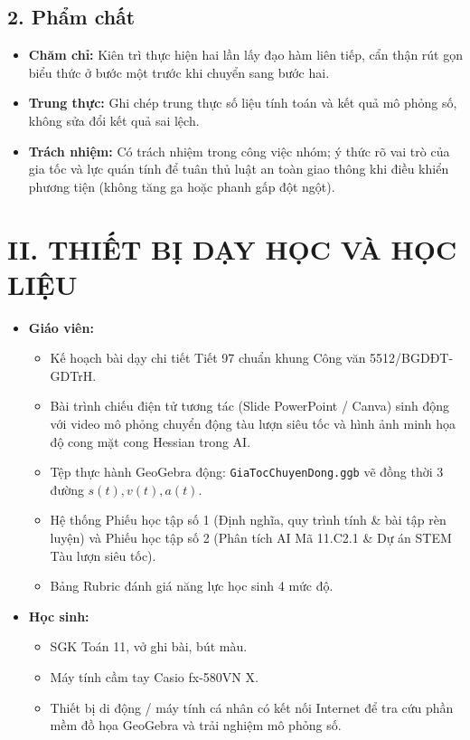 \documentclass[12pt, a4paper]{article}
\begin{document}
\subsection*{2. Phẩm chất}

\begin{itemize}[leftmargin=1.2cm]
    \item \textbf{Chăm chỉ:} Kiên trì thực hiện hai lần lấy đạo hàm liên tiếp, cẩn thận rút gọn biểu thức ở bước một trước khi chuyển sang bước hai.
    \item \textbf{Trung thực:} Ghi chép trung thực số liệu tính toán và kết quả mô phỏng số, không sửa đổi kết quả sai lệch.
    \item \textbf{Trách nhiệm:} Có trách nhiệm trong công việc nhóm; ý thức rõ vai trò của gia tốc và lực quán tính để tuân thủ luật an toàn giao thông khi điều khiển phương tiện (không tăng ga hoặc phanh gấp đột ngột).
\end{itemize}

\section*{II. THIẾT BỊ DẠY HỌC VÀ HỌC LIỆU}

\begin{itemize}[leftmargin=1.2cm]
    \item \textbf{Giáo viên:}
    \begin{itemize}[leftmargin=0.6cm]
        \item Kế hoạch bài dạy chi tiết Tiết 97 chuẩn khung Công văn 5512/BGDĐT-GDTrH.
        \item Bài trình chiếu điện tử tương tác (Slide PowerPoint / Canva) sinh động với video mô phỏng chuyển động tàu lượn siêu tốc và hình ảnh minh họa độ cong mặt cong Hessian trong AI.
        \item Tệp thực hành GeoGebra động: \texttt{GiaTocChuyenDong.ggb} vẽ đồng thời 3 đường $s(t), v(t), a(t)$.
        \item Hệ thống Phiếu học tập số 1 (Định nghĩa, quy trình tính & bài tập rèn luyện) và Phiếu học tập số 2 (Phân tích AI Mã 11.C2.1 & Dự án STEM Tàu lượn siêu tốc).
        \item Bảng Rubric đánh giá năng lực học sinh 4 mức độ.
    \end{itemize}
    \item \textbf{Học sinh:}
    \begin{itemize}[leftmargin=0.6cm]
        \item SGK Toán 11, vở ghi bài, bút màu.
        \item Máy tính cầm tay Casio fx-580VN X.
        \item Thiết bị di động / máy tính cá nhân có kết nối Internet để tra cứu phần mềm đồ họa GeoGebra và trải nghiệm mô phỏng số.
    \end{itemize}
\end{itemize}
\end{document}
